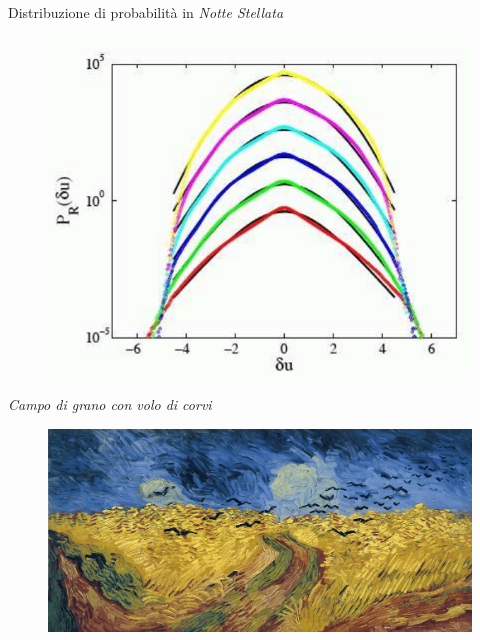 \documentclass[11pt]{beamer}
\begin{document}
\begin{frame}{Distribuzione di probabilità in \emph{Notte Stellata}}
\begin{figure}
\centering
\includegraphics[scale=0.4]{gauss.png}
\end{figure}
\end{frame}

\begin{frame}{\emph{Campo di grano con volo di corvi}}
\begin{figure}
\centering
\includegraphics[scale=0.1]{wheatfield.jpg}
\end{figure}
\end{frame}
\end{document}
